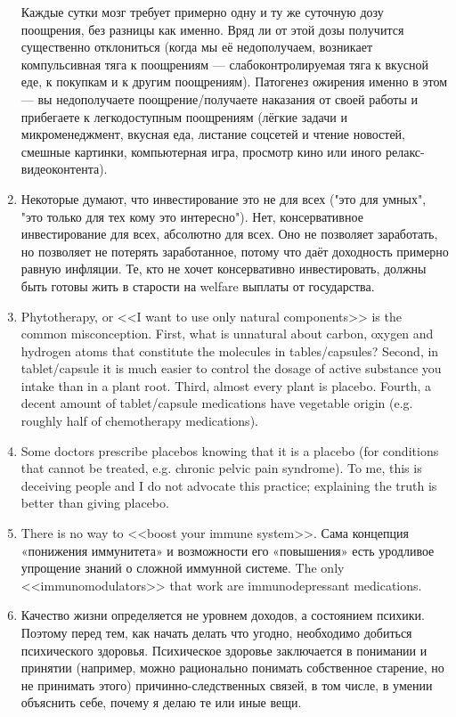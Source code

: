 \documentclass[11pt]{article}
\theoremstyle{remark}
\theoremstyle{definition}
\begin{document}
\begin{enumerate}
Каждые сутки мозг требует примерно одну и ту же суточную дозу поощрения, без разницы как именно. Вряд ли от этой дозы получится существенно отклониться (когда мы её недополучаем, возникает компульсивная тяга к поощрениям — слабоконтролируемая тяга к вкусной еде, к покупкам и к другим поощрениям). Патогенез ожирения именно в этом — вы недополучаете поощрение/получаете наказания от своей работы и прибегаете к легкодоступным поощрениям (лёгкие задачи и микроменеджмент, вкусная еда, листание соцсетей и чтение новостей, смешные картинки, компьютерная игра, просмотр кино или иного релакс-видеоконтента).




\item Некоторые думают, что инвестирование это не для всех ("это для умных", "это только для тех кому это интересно"). Нет, консервативное инвестирование для всех, абсолютно для всех. Оно не позволяет заработать, но позволяет не потерять заработанное, потому что даёт доходность примерно равную инфляции. Те, кто не хочет консервативно инвестировать, должны быть готовы жить в старости на welfare выплаты от государства.




\item Phytotherapy, or <<I want to use only natural components>> is the common misconception. First, what is unnatural about carbon, oxygen and hydrogen atoms that constitute the molecules in tables/capsules? Second, in tablet/capsule it is much easier to control the dosage of active substance you intake than in a plant root. Third, almost every plant is placebo. Fourth, a decent amount of tablet/capsule medications have vegetable origin (e.g. roughly half of chemotherapy medications).

\item Some doctors prescribe placebos knowing that it is a placebo (for conditions that cannot be treated, e.g. chronic pelvic pain syndrome). To me, this is deceiving people and I do not advocate this practice; explaining the truth is better than giving placebo. 

\item There is no way to <<boost your immune system>>. Сама концепция «понижения иммунитета» и возможности его «повышения» есть уродливое упрощение знаний о сложной иммунной системе. The only <<immunomodulators>> that work are immunodepressant medications.



\item Качество жизни определяется не уровнем доходов, а состоянием психики. Поэтому перед тем, как начать делать что угодно, необходимо добиться психического здоровья. Психическое здоровье заключается в понимании и принятии (например, можно рационально понимать собственное старение, но не принимать этого) причинно-следственных связей, в том числе, в умении объяснить себе, почему я делаю те или иные вещи.





\end{enumerate}
\end{document}
